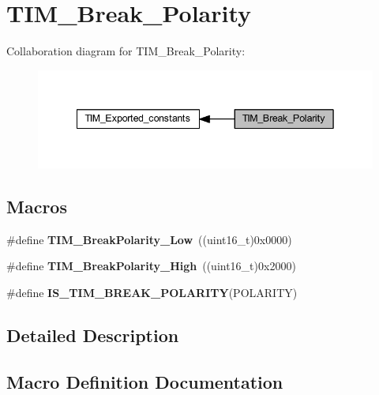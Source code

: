 \hypertarget{group___t_i_m___break___polarity}{}\section{T\+I\+M\+\_\+\+Break\+\_\+\+Polarity}
\label{group___t_i_m___break___polarity}
Collaboration diagram for T\+I\+M\+\_\+\+Break\+\_\+\+Polarity\+:
\nopagebreak
\begin{figure}[H]
\begin{center}
\leavevmode
\includegraphics[width=342pt]{group___t_i_m___break___polarity}
\end{center}
\end{figure}
\subsection*{Macros}
\begin{DoxyCompactItemize}
\item 
\mbox{\label{group___t_i_m___break___polarity_ga565656ca81d17f9a1807afe3971dff6e}} 
\#define {\bfseries T\+I\+M\+\_\+\+Break\+Polarity\+\_\+\+Low}~((uint16\+\_\+t)0x0000)
\item 
\mbox{\label{group___t_i_m___break___polarity_gabd4b72079548fd8903413a348539542b}} 
\#define {\bfseries T\+I\+M\+\_\+\+Break\+Polarity\+\_\+\+High}~((uint16\+\_\+t)0x2000)
\item 
\#define {\bfseries I\+S\+\_\+\+T\+I\+M\+\_\+\+B\+R\+E\+A\+K\+\_\+\+P\+O\+L\+A\+R\+I\+TY}(P\+O\+L\+A\+R\+I\+TY)
\end{DoxyCompactItemize}


\subsection{Detailed Description}


\subsection{Macro Definition Documentation}
\mbox{\label{group___t_i_m___break___polarity_gaa29e33e74c5ff10972357ddd3f47f078}} 
